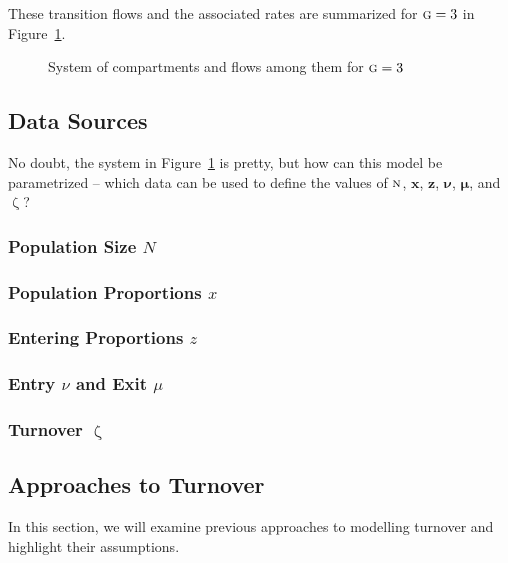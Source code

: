 \documentclass{article}
\numberwithin{equation}{section}
\renewcommand{\zeta}{\upzeta}
\newcommand{\N}{\textsc{n}}
\newcommand{\G}{\textsc{g}}
\begin{document}
These transition flows and the associated rates are summarized for $\G = 3$ in Figure~\ref{fig:system}.
\begin{figure}[h]
  \centering
  \caption{System of compartments and flows among them for $\G = 3$}
  \label{fig:system}
\end{figure}
\subsection{Data Sources}
No doubt, the system in Figure~\ref{fig:system} is pretty,
but how can this model be parametrized
-- which data can be used to define the values of
$\N$, $\bm{x}$, $\bm{z}$, $\bm{\nu}$, $\bm{\mu}$, and $\zeta$\thinspace?
\subsubsection{Population Size $N$}
\subsubsection{Population Proportions $x$}
\subsubsection{Entering Proportions $z$}
\subsubsection{Entry $\nu$ and Exit $\mu$}
\subsubsection{Turnover $\zeta$}
\subsection{Approaches to Turnover}
In this section, we will examine previous approaches to modelling turnover
and highlight their assumptions.
\end{document}
